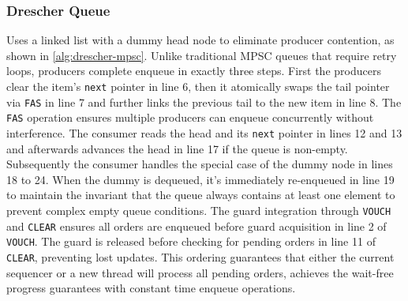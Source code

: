 \subsubsection{Drescher Queue}\label{subsubsec:drescher-mpsc-queue}
Uses a linked list with a dummy head node to eliminate producer contention, as shown in \cref{alg:drescher-mpsc}. Unlike traditional \ac{MPSC} queues that require retry loops, producers complete enqueue in exactly three steps. First the producers clear the item's \texttt{next} pointer in line 6, then it atomically swaps the tail pointer via \texttt{\ac{FAS}} in line 7 and further links the previous tail to the new item in line 8. The \texttt{\ac{FAS}} operation ensures multiple producers can enqueue concurrently without interference. The consumer reads the head and its \texttt{next} pointer in lines 12 and 13 and afterwards advances the head in line 17 if the queue is non-empty. Subsequently the consumer handles the special case of the dummy node in lines 18 to 24. When the dummy is dequeued, it's immediately re-enqueued in line 19 to maintain the invariant that the queue always contains at least one element to prevent complex empty queue conditions. The guard integration through \texttt{VOUCH} and \texttt{CLEAR} ensures all orders are enqueued before guard acquisition in line 2 of \texttt{VOUCH}. The guard is released before checking for pending orders in line 11 of \texttt{CLEAR}, preventing lost updates. This ordering guarantees that either the current sequencer or a new thread will process all pending orders, achieves the wait-free progress guarantees with constant time enqueue operations. \cite{Drescher2015GuardedSections}

